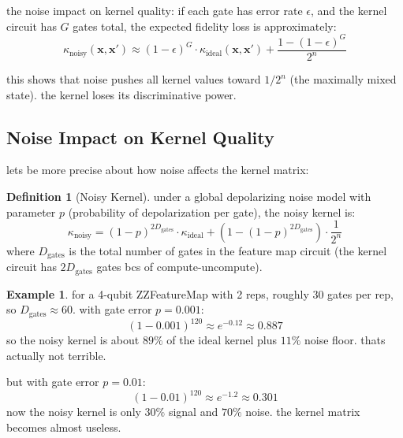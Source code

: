 \documentclass[11pt,a4paper]{article}
\theoremstyle{definition}
\newtheorem{definition}{Definition}[section]
\newtheorem{example}{Example}[section]
\theoremstyle{remark}
\begin{document}
the noise impact on kernel quality: if each gate has error rate $\epsilon$, and the kernel circuit has $G$ gates total, the expected fidelity loss is approximately:
\[
\kappa_{\text{noisy}}(\mathbf{x}, \mathbf{x}') \approx (1-\epsilon)^G \cdot \kappa_{\text{ideal}}(\mathbf{x}, \mathbf{x}') + \frac{1 - (1-\epsilon)^G}{2^n}
\]

this shows that noise pushes all kernel values toward $1/2^n$ (the maximally mixed state). the kernel loses its discriminative power.

\subsection{Noise Impact on Kernel Quality}

lets be more precise about how noise affects the kernel matrix:

\begin{definition}[Noisy Kernel]
under a global depolarizing noise model with parameter $p$ (probability of depolarization per gate), the noisy kernel is:
\[
\kappa_{\text{noisy}} = (1-p)^{2D_{\text{gates}}} \cdot \kappa_{\text{ideal}} + (1 - (1-p)^{2D_{\text{gates}}}) \cdot \frac{1}{2^n}
\]
where $D_{\text{gates}}$ is the total number of gates in the feature map circuit (the kernel circuit has $2D_{\text{gates}}$ gates bcs of compute-uncompute).
\end{definition}

\begin{example}
for a 4-qubit ZZFeatureMap with 2 reps, roughly 30 gates per rep, so $D_{\text{gates}} \approx 60$. with gate error $p = 0.001$:
\[
(1 - 0.001)^{120} \approx e^{-0.12} \approx 0.887
\]
so the noisy kernel is about $89\%$ of the ideal kernel plus $11\%$ noise floor. thats actually not terrible.

but with gate error $p = 0.01$:
\[
(1 - 0.01)^{120} \approx e^{-1.2} \approx 0.301
\]
now the noisy kernel is only $30\%$ signal and $70\%$ noise. the kernel matrix becomes almost useless.
\end{example}
\end{document}
